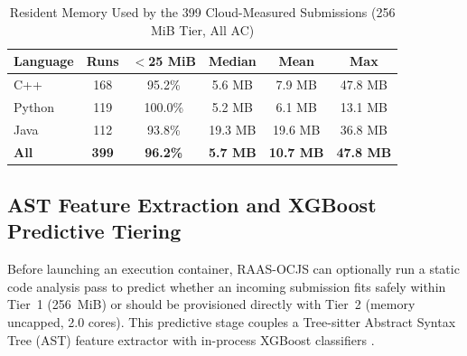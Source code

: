 \documentclass[conference]{IEEEtran}
\begin{document}
\begin{table}[!t]
\caption{Resident Memory Used by the 399 Cloud-Measured Submissions (256 MiB Tier, All AC)}
\label{tab:mem_dist}
\centering
\scriptsize
\begin{tabular}{|l|c|c|c|c|c|}
\hline
\textbf{Language} & \textbf{Runs} & \textbf{$<$25 MiB} & \textbf{Median} & \textbf{Mean} & \textbf{Max} \\
\hline
C++ & 168 & 95.2\% & 5.6 MB & 7.9 MB & 47.8 MB \\
\hline
Python & 119 & 100.0\% & 5.2 MB & 6.1 MB & 13.1 MB \\
\hline
Java & 112 & 93.8\% & 19.3 MB & 19.6 MB & 36.8 MB \\
\hline
\textbf{All} & \textbf{399} & \textbf{96.2\%} & \textbf{5.7 MB} & \textbf{10.7 MB} & \textbf{47.8 MB} \\
\hline
\end{tabular}
\end{table}



\subsection{AST Feature Extraction and XGBoost Predictive Tiering}
Before launching an execution container, RAAS-OCJS can optionally run a static code analysis pass to predict whether an incoming submission fits safely within Tier~1 (256~MiB) or should be provisioned directly with Tier~2 (memory uncapped, 2.0 cores). This predictive stage couples a Tree-sitter Abstract Syntax Tree (AST) feature extractor with in-process XGBoost classifiers \cite{chen2016xgboost}.
\end{document}
